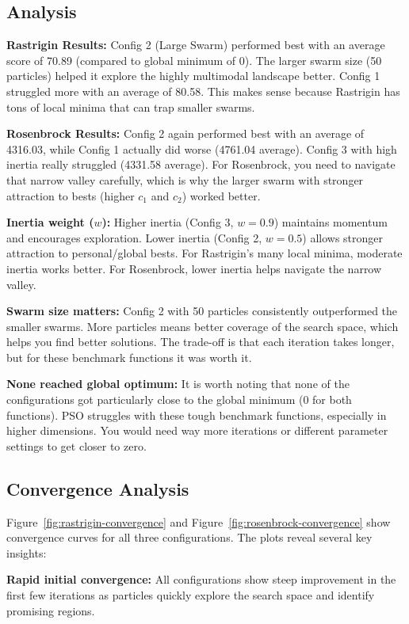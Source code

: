 \documentclass[letterpaper]{article}
\begin{document}
\subsection{Analysis}

\textbf{Rastrigin Results:} Config 2 (Large Swarm) performed best with an average score of 70.89 (compared to global minimum of 0). The larger swarm size (50 particles) helped it explore the highly multimodal landscape better. Config 1 struggled more with an average of 80.58. This makes sense because Rastrigin has tons of local minima that can trap smaller swarms.

\textbf{Rosenbrock Results:} Config 2 again performed best with an average of 4316.03, while Config 1 actually did worse (4761.04 average). Config 3 with high inertia really struggled (4331.58 average). For Rosenbrock, you need to navigate that narrow valley carefully, which is why the larger swarm with stronger attraction to bests (higher $c_1$ and $c_2$) worked better.

\textbf{Inertia weight (}$w$\textbf{):} Higher inertia (Config 3, $w=0.9$) maintains momentum and encourages exploration. Lower inertia (Config 2, $w=0.5$) allows stronger attraction to personal/global bests. For Rastrigin's many local minima, moderate inertia works better. For Rosenbrock, lower inertia helps navigate the narrow valley.

\textbf{Swarm size matters:} Config 2 with 50 particles consistently outperformed the smaller swarms. More particles means better coverage of the search space, which helps you find better solutions. The trade-off is that each iteration takes longer, but for these benchmark functions it was worth it.

\textbf{None reached global optimum:} It is worth noting that none of the configurations got particularly close to the global minimum (0 for both functions). PSO struggles with these tough benchmark functions, especially in higher dimensions. You would need way more iterations or different parameter settings to get closer to zero.

\subsection{Convergence Analysis}

Figure~\ref{fig:rastrigin-convergence} and Figure~\ref{fig:rosenbrock-convergence} show convergence curves for all three configurations. The plots reveal several key insights:

\textbf{Rapid initial convergence:} All configurations show steep improvement in the first few iterations as particles quickly explore the search space and identify promising regions.
\end{document}
